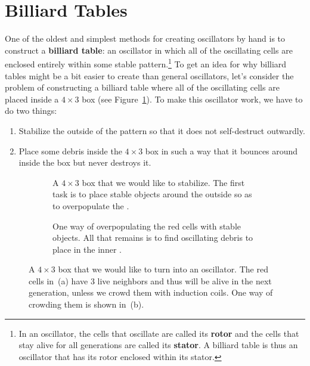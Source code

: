 \section{Billiard Tables}\label{sec:billiard_tables}

One of the oldest and simplest methods for creating oscillators by hand is to construct a \textbf{billiard table}: an oscillator in which all of the oscillating cells are enclosed entirely within some stable pattern.\footnote{In an oscillator, the cells that oscillate are called its \textbf{rotor} and the cells that stay alive for all generations are called its \textbf{stator}. A billiard table is thus an oscillator that has its rotor enclosed within its stator.} To get an idea for why billiard tables might be a bit easier to create than general oscillators, let's consider the problem of constructing a billiard table where all of the oscillating cells are placed inside a $4 \times 3$ box (see Figure~\ref{fig:billiard_table_start_1}). To make this oscillator work, we have to do two things:\medskip

\begin{enumerate}
	\item[1)] Stabilize the outside of the pattern so that it does not self-destruct outwardly.\smallskip
	
	\item[2)] Place some debris inside the $4 \times 3$ box in such a way that it bounces around inside the box but never destroys it.\medskip
\end{enumerate}

\begin{figure}[!htb]
	\centering
	\begin{subfigure}{.48\textwidth}
		\centering
		\caption{A $4 \times 3$ box that we would like to stabilize. The first task is to place stable objects around the outside so as to overpopulate the .}
		\label{fig:billiard_table_start_1}
	\end{subfigure} \hfill %
	\begin{subfigure}{.48\textwidth}
		\centering
		\caption{One way of overpopulating the red cells with stable objects. All that remains is to find oscillating debris to place in the inner .}
		\label{fig:billiard_table_start_2}
	\end{subfigure}
	\caption{A $4 \times 3$ box that we would like to turn into an oscillator. The red cells in~(a) have 3 live neighbors and thus will be alive in the next generation, unless we crowd them with induction coils. One way of crowding them is shown in~(b).}\label{fig:billiard_table_start}
\end{figure}

